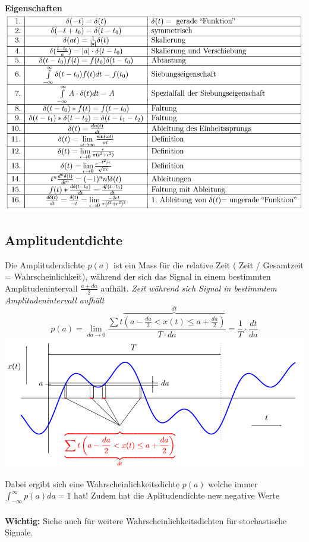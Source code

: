 \textbf{Eigenschaften}\\
\includegraphics[width=\columnwidth]{Images/delta}

\subsection{Amplitudentdichte}
Die Amplitudendichte $p(a)$ ist ein Mass für die relative Zeit ( Zeit /
Gesamtzeit = Wahrscheinlichkeit), während der sich das Signal in einem
bestimmten Amplitudenintervall $\frac{a\pm da}{2}$ aufhält. \textit{Zeit während
sich Signal in bestimmtem Amplitudenintervall aufhält}
\[
p(a) = \lim\limits_{da\rightarrow 0}\frac{\sum t\overbrace{\left(a - \frac{da}{2} < x(t) \leq a + \frac{da}{2}\right)}^{dt}}{T\cdot da} = \frac{1}{T} \cdot \frac{dt}{da}
\]
\includegraphics[width=\columnwidth]{Images/aplitudenspektrum}

Dabei ergibt sich eine Wahrscheinlichkeitsdichte $p(a)$ welche immer $\int_{-\infty}^{\infty}p(a)da = 1$ hat! Zudem hat die Aplitudendichte new negative Werte
~\\ ~\\
\textbf{Wichtig:} Siehe auch  für weitere Wahrscheinlichkeitsdichten für stochastische Signale.

